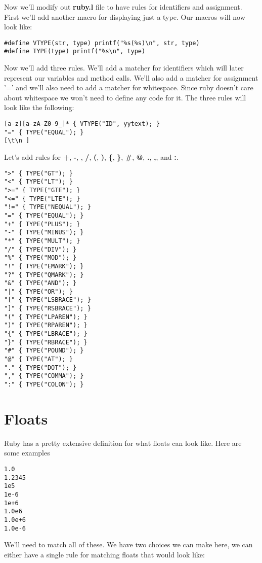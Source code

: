 {Now we'll modify out {\bf ruby.l} file to have rules for identifiers and assignment. First we'll add another macro for displaying just a type. Our macros will now look like:

\begin{lstlisting}
#define VTYPE(str, type) printf("%s(%s)\n", str, type)
#define TYPE(type) printf("%s\n", type)
\end{lstlisting}

Now we'll add three rules. We'll add a matcher for identifiers which will later represent our variables and method calls. We'll also add a matcher for assignment '=' and we'll also need to add a matcher for whitespace. Since ruby doesn't care about whitespace we won't need to define any code for it. The three rules will look like the following:

\begin{lstlisting}
[a-z][a-zA-Z0-9_]* { VTYPE("ID", yytext); }
"=" { TYPE("EQUAL"); }
[\t\n ]
\end{lstlisting}

Let's add rules for {\bf +}, {\bf -}, {\bf *}, {\bf /}, {\bf (}, {\bf )}, {\bf \{}, {\bf \}}, {\bf \#}, {\bf @}, {\bf .}, {\bf ,}, and {\bf :}.

\begin{lstlisting}
">" { TYPE("GT"); }
"<" { TYPE("LT"); }
">=" { TYPE("GTE"); }
"<=" { TYPE("LTE"); }
"!=" { TYPE("NEQUAL"); }
"=" { TYPE("EQUAL"); }
"+" { TYPE("PLUS"); }
"-" { TYPE("MINUS"); }
"*" { TYPE("MULT"); }
"/" { TYPE("DIV"); }
"%" { TYPE("MOD"); }
"!" { TYPE("EMARK"); }
"?" { TYPE("QMARK"); }
"&" { TYPE("AND"); }
"|" { TYPE("OR"); }
"[" { TYPE("LSBRACE"); }
"]" { TYPE("RSBRACE"); }
"(" { TYPE("LPAREN"); }
")" { TYPE("RPAREN"); }
"{" { TYPE("LBRACE"); }
"}" { TYPE("RBRACE"); }
"#" { TYPE("POUND"); }
"@" { TYPE("AT"); }
"." { TYPE("DOT"); }
"," { TYPE("COMMA"); }
":" { TYPE("COLON"); }
\end{lstlisting}

\section{Floats}

Ruby has a pretty extensive definition for what floats can look like. Here are some examples

\begin{lstlisting}
1.0
1.2345
1e5
1e-6
1e+6
1.0e6
1.0e+6
1.0e-6
\end{lstlisting}

We'll need to match all of these. We have two choices we can make here, we can either have a single rule for matching floats that would look like:

}
